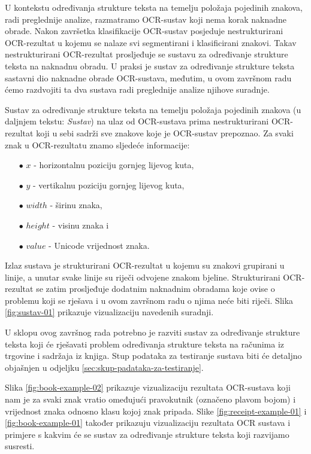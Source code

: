 \documentclass[times, utf8, zavrsni]{fer}
\begin{document}
U kontekstu određivanja strukture teksta na temelju položaja pojedinih znakova,
radi preglednije analize, razmatramo OCR-sustav koji nema
korak naknadne obrade. Nakon završetka klasifikacije OCR-sustav posjeduje
nestrukturirani OCR-rezultat u kojemu se nalaze svi segmentirani i
klasificirani znakovi. Takav
nestrukturirani OCR-rezultat prosljeđuje se sustavu za određivanje strukture
teksta na naknadnu obradu.
U praksi je sustav za određivanje strukture teksta sastavni dio naknadne obrade OCR-sustava, međutim, u ovom završnom radu ćemo razdvojiti ta dva sustava
radi preglednije analize njihove suradnje.

Sustav za određivanje strukture teksta na temelju položaja pojedinih znakova
(u daljnjem tekstu: \emph{Sustav}) na ulaz od OCR-sustava prima
nestrukturirani OCR-rezultat koji u sebi sadrži sve znakove koje je OCR-sustav
prepoznao. Za svaki znak u OCR-rezultatu znamo sljedeće informacije:
\begin{itemize}
    \item[$\bullet$] $x$ - horizontalnu poziciju gornjeg lijevog kuta,
    \item[$\bullet$] $y$ - vertikalnu poziciju gornjeg lijevog kuta,
    \item[$\bullet$] $width$ - širinu znaka,
    \item[$\bullet$] $height$ - visinu znaka i
    \item[$\bullet$] $value$ - Unicode vrijednost znaka.
\end{itemize}

Izlaz sustava je strukturirani OCR-rezultat u kojemu su znakovi
grupirani u linije, a unutar svake linije su riječi odvojene znakom
bjeline. Strukturirani OCR-rezultat se zatim prosljeđuje dodatnim naknadnim
obradama koje ovise o problemu koji se rješava i u ovom završnom radu o njima
neće biti riječi. Slika \ref{fig:sustav-01} prikazuje vizualizaciju navedenih
suradnji.

U sklopu ovog završnog rada potrebno je razviti sustav za određivanje strukture
teksta koji će rješavati problem određivanja strukture teksta na računima iz
trgovine i sadržaja iz knjiga. Stup podataka za testiranje
sustava biti će detaljno objašnjen u odjeljku
\ref{sec:skup-padataka-za-testiranje}.

Slika \ref{fig:book-example-02} prikazuje vizualizaciju rezultata OCR-sustava
koji nam je za svaki znak vratio omeđujući pravokutnik (označeno plavom bojom) i
vrijednost znaka odnosno klasu kojoj znak pripada.
Slike \ref{fig:receipt-example-01} i \ref{fig:book-example-01} također prikazuju
vizualizaciju rezultata OCR sustava i primjere s kakvim će se sustav za
određivanje strukture teksta koji razvijamo susresti.
\end{document}
